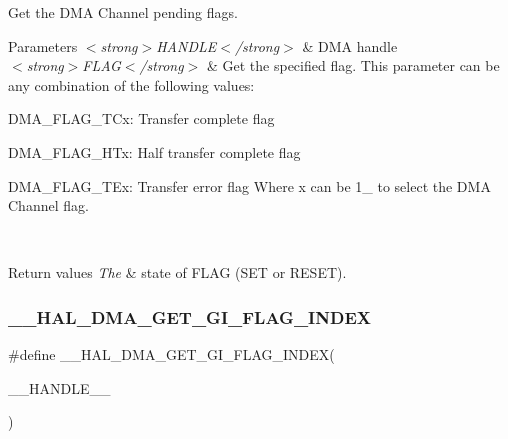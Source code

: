 Get the D\+MA Channel pending flags. 


\begin{DoxyParams}{Parameters}
{\em $<$strong$>$\+H\+A\+N\+D\+L\+E$<$/strong$>$} & D\+MA handle \\
\hline
{\em $<$strong$>$\+F\+L\+A\+G$<$/strong$>$} & Get the specified flag. This parameter can be any combination of the following values\+: \begin{DoxyItemize}
\item D\+M\+A\+\_\+\+F\+L\+A\+G\+\_\+\+T\+Cx\+: Transfer complete flag \item D\+M\+A\+\_\+\+F\+L\+A\+G\+\_\+\+H\+Tx\+: Half transfer complete flag \item D\+M\+A\+\_\+\+F\+L\+A\+G\+\_\+\+T\+Ex\+: Transfer error flag Where x can be 1\+\_ to select the D\+MA Channel flag. \end{DoxyItemize}
\\
\hline
\end{DoxyParams}

\begin{DoxyRetVals}{Return values}
{\em The} & state of F\+L\+AG (S\+ET or R\+E\+S\+ET). \\
\hline
\end{DoxyRetVals}
\mbox{\label{group___d_m_a_ex___exported___macros_ga718c628ea8c112c5b09bc61c52b86e75}} 
\subsubsection{\texorpdfstring{\+\_\+\+\_\+\+H\+A\+L\+\_\+\+D\+M\+A\+\_\+\+G\+E\+T\+\_\+\+G\+I\+\_\+\+F\+L\+A\+G\+\_\+\+I\+N\+D\+EX}{\_\_HAL\_DMA\_GET\_GI\_FLAG\_INDEX}}
{\footnotesize\ttfamily \#define \+\_\+\+\_\+\+H\+A\+L\+\_\+\+D\+M\+A\+\_\+\+G\+E\+T\+\_\+\+G\+I\+\_\+\+F\+L\+A\+G\+\_\+\+I\+N\+D\+EX(\begin{DoxyParamCaption}\item[{}]{\+\_\+\+\_\+\+H\+A\+N\+D\+L\+E\+\_\+\+\_\+ }\end{DoxyParamCaption})}

